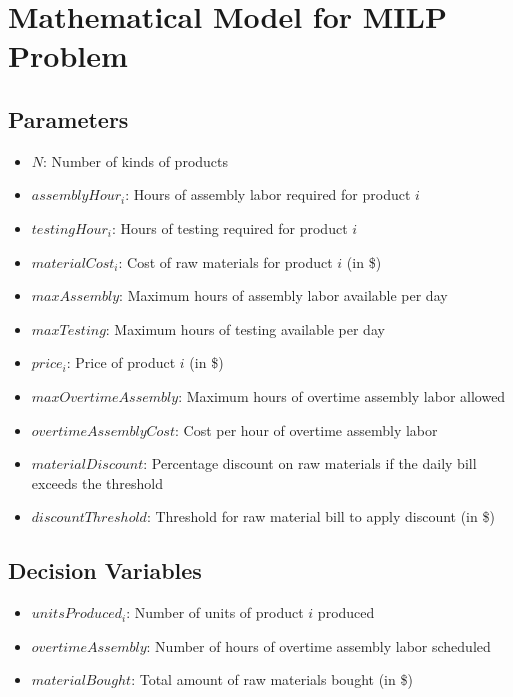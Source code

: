 \documentclass{article}
\begin{document}
\section*{Mathematical Model for MILP Problem}

\subsection*{Parameters}

\begin{itemize}
    \item $N$: Number of kinds of products
    \item $assemblyHour_i$: Hours of assembly labor required for product $i$
    \item $testingHour_i$: Hours of testing required for product $i$
    \item $materialCost_i$: Cost of raw materials for product $i$ (in \$)
    \item $maxAssembly$: Maximum hours of assembly labor available per day
    \item $maxTesting$: Maximum hours of testing available per day
    \item $price_i$: Price of product $i$ (in \$)
    \item $maxOvertimeAssembly$: Maximum hours of overtime assembly labor allowed
    \item $overtimeAssemblyCost$: Cost per hour of overtime assembly labor
    \item $materialDiscount$: Percentage discount on raw materials if the daily bill exceeds the threshold
    \item $discountThreshold$: Threshold for raw material bill to apply discount (in \$)
\end{itemize}

\subsection*{Decision Variables}

\begin{itemize}
    \item $unitsProduced_i$: Number of units of product $i$ produced
    \item $overtimeAssembly$: Number of hours of overtime assembly labor scheduled
    \item $materialBought$: Total amount of raw materials bought (in \$)
\end{itemize}
\end{document}
